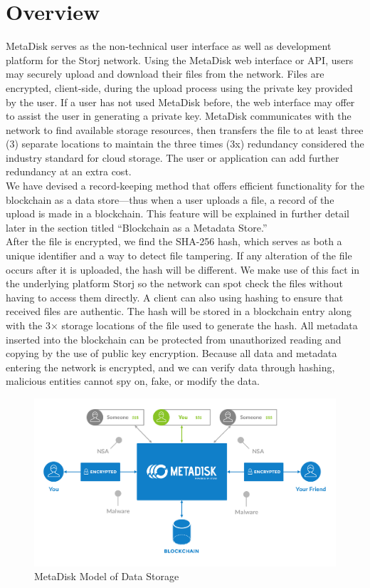 \documentclass[a4paper,10pt]{article}
\begin{document}
\section{Overview}

MetaDisk serves as the non-technical user interface as well as development platform for the Storj network. Using the MetaDisk web interface or API, users may securely upload and download their files from the network. Files are encrypted, client-side, during the upload process using the private key provided by the user.  If a user has not used MetaDisk before, the web interface may offer to assist the user in generating a private key. MetaDisk communicates with the network to find available storage resources, then transfers the file to at least three (3) separate locations to maintain the three times (3x) redundancy considered the industry standard for cloud storage. The user or application can add further redundancy at an extra cost. \\

We have devised a record-keeping method that offers efficient functionality for the blockchain as a data store—thus when a user uploads a file, a record of the upload is made in a blockchain. This feature will be explained in further detail later in the section titled “Blockchain as a Metadata Store.”\\

After the file is encrypted, we find the SHA-256 hash, which serves as both a unique identifier and a way to detect file tampering.  If any alteration of the file occurs after it is uploaded, the hash will be different. We make use of this fact in the underlying platform Storj \cite{7} so the network can spot check the files without having to access them directly. A client can also using hashing to ensure that received files are authentic. The hash will be stored in a blockchain entry along with the 3× storage locations of the file used to generate the hash.  All metadata inserted into the blockchain can be protected from unauthorized reading and copying by the use of public key encryption.  Because all data and metadata entering the network is encrypted, and we can verify data through hashing, malicious entities cannot spy on, fake, or modify the data.

\begin{figure}[h!]
  \centering
      \includegraphics[width=\linewidth]{02}
  \caption{MetaDisk Model of Data Storage}
\end{figure}
\end{document}
